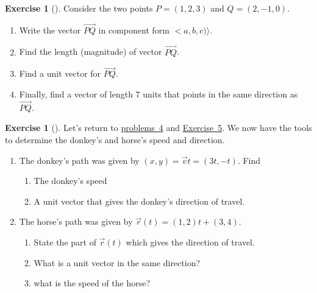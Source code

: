 \documentclass[10pt,]{book}
\theoremstyle{plain}
\theoremstyle{definition}
\theoremstyle{definition}
\theoremstyle{definition}
\theoremstyle{definition}
\newtheorem{exploration}[project]{Exercise}
\theoremstyle{definition}
\numberwithin{equation}{section}
\newcommand{\lt}{<}
\begin{document}
\begin{exploration}[]\label{exploration-25}
Consider the two points \(P=(1,2,3)\) and \(Q=(2,-1,0)\).%
\begin{enumerate}[font=\bfseries,label=(\alph*),ref=\alph*]
\item\label{task-46} Write the vector \(\vec {PQ}\) in component form \(\lt a,b,c)\rangle\).%
\item\label{task-47} Find the length (magnitude) of vector \(\vec {PQ}\).%
\item\label{task-48} Find a unit vector for \(\vec{PQ}\).%
\item\label{task-49} Finally, find a vector of length 7 units that points in the same direction as \(\vec{PQ}\).%
\end{enumerate}
\end{exploration}
\begin{exploration}[]\label{exploration-26}
Let's return to \hyperref[prob_donkey]{problems~4} and \hyperref[prob_horseline]{Exercise~5}. We now have the tools to determine the donkey's and horse's speed and direction.%
\begin{enumerate}[font=\bfseries,label=(\alph*),ref=\alph*]
\item\label{task-50} The donkey's path was given by \((x,y)=\vec v t = (3t,-t)\). Find%
\begin{enumerate}[font=\bfseries,label=(\roman*),ref=\theenumi.\roman*]
\item\label{task-51} The donkey's speed%
\item\label{task-52} A unit vector that gives the donkey's direction of travel.%
\end{enumerate}
\item\label{task-53} The horse's path was given by \(\vec r(t) = (1,2)t + (3,4)\).%
\begin{enumerate}[font=\bfseries,label=(\roman*),ref=\theenumi.\roman*]
\item\label{task-54} State the part of \(\vec r(t)\) which gives the direction of travel.%
\item\label{task-55} What is a unit vector in the same direction?%
\item\label{task-56} what is the speed of the horse?%
\end{enumerate}
\end{enumerate}
\end{exploration}
\typeout{************************************************}
\typeout{************************************************}
\end{document}
